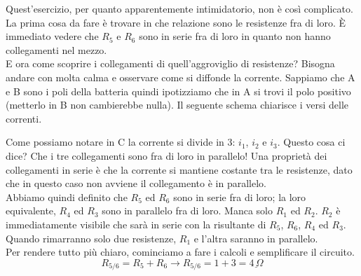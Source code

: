 Quest'esercizio, per quanto apparentemente intimidatorio, non è così complicato. La prima cosa da fare
è trovare in che relazione sono le resistenze fra di loro. È immediato vedere che $R_5$ e $R_6$ sono
in serie fra di loro in quanto non hanno collegamenti nel mezzo.\\
E ora come scoprire i collegamenti di quell'aggroviglio di resistenze? Bisogna andare con molta calma
e osservare come si diffonde la corrente. Sappiamo che A e B sono i poli della batteria quindi 
ipotizziamo che in A si trovi il polo positivo (metterlo in B non cambierebbe nulla). Il seguente
schema chiarisce i versi delle correnti.
\begin{center}
\end{center}
Come possiamo notare in C la corrente si divide in 3: $i_1$, $i_2$ e $i_3$. Questo cosa ci dice? Che i
tre collegamenti sono fra di loro in parallelo! Una proprietà dei collegamenti in serie è che la 
corrente si mantiene costante tra le resistenze, dato che in questo caso non avviene il collegamento
è in parallelo.\\
Abbiamo quindi definito che $R_5$ ed $R_6$ sono in serie fra di loro; la loro equivalente, $R_4$ ed
$R_3$ sono in parallelo fra di loro. Manca solo $R_1$ ed $R_2$. $R_2$ è immediatamente visibile che 
sarà in serie con la risultante di $R_5$, $R_6$, $R_4$ ed $R_3$. Quando rimarranno solo due 
resistenze, $R_1$ e l'altra saranno in parallelo.\\[\baselineskip]

Per rendere tutto più chiaro, cominciamo a fare i calcoli e semplificare il circuito.
\begin{equation*}
  R_{5/6} = R_5 + R_6 \rightarrow R_{5/6} = 1 + 3 = \underline{4\,\Omega}
\end{equation*}

